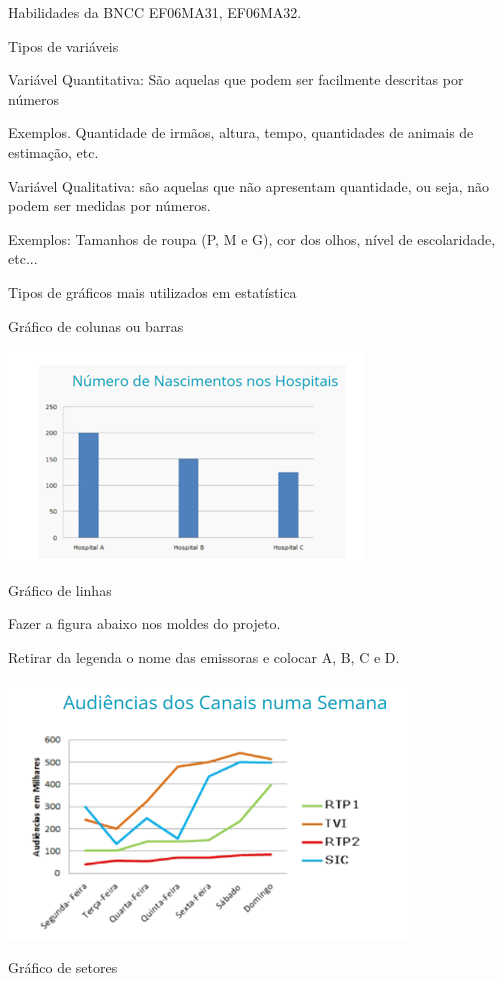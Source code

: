 Habilidades da BNCC EF06MA31, EF06MA32.

Tipos de variáveis

Variável Quantitativa: São aquelas que podem ser facilmente descritas
por números

Exemplos. Quantidade de irmãos, altura, tempo, quantidades de animais de
estimação, etc.

Variável Qualitativa: são aquelas que não apresentam quantidade, ou
seja, não podem ser medidas por números.

Exemplos: Tamanhos de roupa (P, M e G), cor dos olhos, nível de
escolaridade, etc...

Tipos de gráficos mais utilizados em estatística

Gráfico de colunas ou barras

\includegraphics[width=3.71875in,height=2.20833in]{./imgSAEB_6_MAT/media/image77.png}

Gráfico de linhas

Fazer a figura abaixo nos moldes do projeto.

Retirar da legenda o nome das emissoras e colocar A, B, C e D.

\includegraphics[width=4.1875in,height=2.6875in]{./imgSAEB_6_MAT/media/image79.png}

Gráfico de setores

